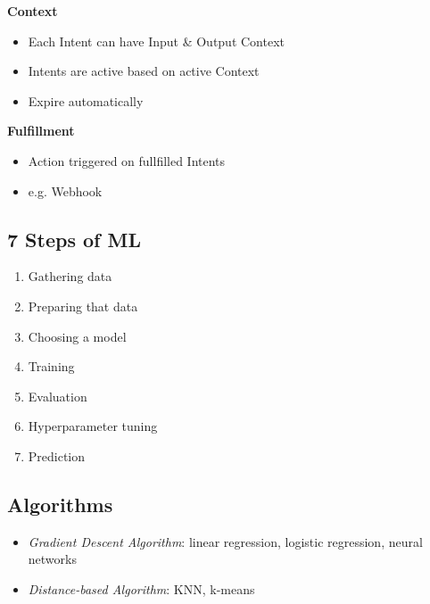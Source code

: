 \textbf{Context}
\begin{itemize}
    \item Each Intent can have Input \& Output Context
    \item Intents are active based on active Context
    \item Expire automatically
\end{itemize}
\textbf{Fulfillment}
\begin{itemize}
    \item Action triggered on fullfilled Intents
    \item e.g. Webhook
\end{itemize}

\subsection{7 Steps of ML}
\begin{enumerate}
    \item Gathering data
    \item Preparing that data
    \item Choosing a model
    \item Training
    \item Evaluation
    \item Hyperparameter tuning
    \item Prediction
\end{enumerate}

\subsection{Algorithms}
\begin{itemize}
    \item \textit{Gradient Descent Algorithm}: linear regression, logistic regression, neural networks
    \item \textit{Distance-based Algorithm}: KNN, k-means
\end{itemize}